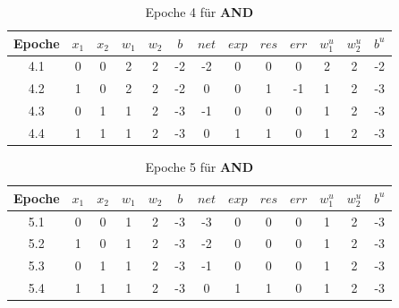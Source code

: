 \setlength{\tabcolsep}{0.8em}
\begin{table} %
    \centering
    \begin{tabular}{c | c | c | c | c | c | c | c | c | c | c | c | c}
        Epoche & $x_1$ & $x_2$ & $w_1$ & $w_2$ & $b$ & $net$ & $exp$ & $res$ & $err$ & $w^u_1$ & $w^u_2$ & $b^u$ \\
        \hline
        4.1& 0     & 0     & 2     & 2     & -2  & -2    & 0     & 0     & 0   & 2       & 2       & -2    \\
        4.2& 1     & 0     & 2     & 2     & -2  & 0     & 0     & 1     & -1  & 1       & 2       & -3    \\
        4.3& 0     & 1     & 1     & 2     & -3  & -1    & 0     & 0     & 0   & 1       & 2       & -3    \\
        4.4& 1     & 1     & 1     & 2     & -3  & 0     & 1     & 1     & 0   & 1       & 2       & -3    \\
    \end{tabular}
    \caption{Epoche 4 für \textbf{AND}}
    \label{tab:mcp-andep4}
\end{table}

\setlength{\tabcolsep}{0.8em}
\begin{table} %
    \centering
    \begin{tabular}{c | c | c | c | c | c | c | c | c | c | c | c | c}
        Epoche & $x_1$ & $x_2$ & $w_1$ & $w_2$ & $b$ & $net$ & $exp$ & $res$ & $err$ & $w^u_1$ & $w^u_2$ & $b^u$ \\
        \hline
        5.1& 0     & 0     & 1     & 2     & -3  & -3    & 0     & 0     & 0   & 1       & 2       & -3    \\
        5.2& 1     & 0     & 1     & 2     & -3  & -2    & 0     & 0     & 0   & 1       & 2       & -3    \\
        5.3& 0     & 1     & 1     & 2     & -3  & -1    & 0     & 0     & 0   & 1       & 2       & -3    \\
        5.4& 1     & 1     & 1     & 2     & -3  & 0     & 1     & 1     & 0   & 1       & 2       & -3    \\
    \end{tabular}
    \caption{Epoche 5 für \textbf{AND}}
    \label{tab:mcp-andep5}
\end{table}




